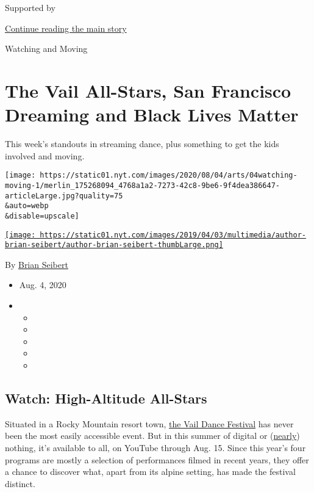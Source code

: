 Supported by

\protect\hyperlink{after-sponsor}{Continue reading the main story}

Watching and Moving

\hypertarget{the-vail-all-stars-san-francisco-dreaming-and-black-lives-matter}{%
\section{The Vail All-Stars, San Francisco Dreaming and Black Lives
Matter}\label{the-vail-all-stars-san-francisco-dreaming-and-black-lives-matter}}

This week's standouts in streaming dance, plus something to get the kids
involved and moving.

\texttt{[image: https://static01.nyt.com/images/2020/08/04/arts/04watching-moving-1/merlin\_175268094\_4768a1a2-7273-42c8-9be6-9f4dea386647-articleLarge.jpg?quality=75\\\&auto=webp\\\&disable=upscale]}

\href{https://www.nytimes.com/by/brian-seibert}{\texttt{[image: https://static01.nyt.com/images/2019/04/03/multimedia/author-brian-seibert/author-brian-seibert-thumbLarge.png]}}

By \href{https://www.nytimes.com/by/brian-seibert}{Brian Seibert}

\begin{itemize}
\item
  Aug. 4, 2020
\item
  \begin{itemize}
  \item
  \item
  \item
  \item
  \item
  \end{itemize}
\end{itemize}

\hypertarget{watch-high-altitude-all-stars}{%
\subsection{Watch: High-Altitude
All-Stars}\label{watch-high-altitude-all-stars}}

Situated in a Rocky Mountain resort town,
\href{https://vaildance.org/}{the Vail Dance Festival} has never been
the most easily accessible event. But in this summer of digital or
(\href{https://www.nytimes.com/2020/07/29/arts/dance/kaatsbaan-dance-festival-stella-abrera.html}{nearly})
nothing, it's available to all, on YouTube through Aug. 15. Since this
year's four programs are mostly a selection of performances filmed in
recent years, they offer a chance to discover what, apart from its
alpine setting, has made the festival distinct.

